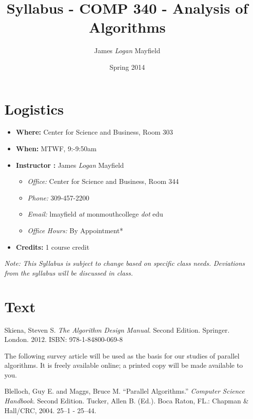 \documentclass[10pt]{article}
\title{Syllabus - COMP 340 - Analysis of Algorithms}
\author{ James \textit{Logan} Mayfield }
\date{ Spring 2014}
\begin{document}
\maketitle

\section{Logistics}
\begin{itemize}
\item \textbf{Where: } Center for Science and Business, Room 303
\item \textbf{When: } MTWF, 9:-9:50am
\item \textbf{Instructor :} James \textit{Logan} Mayfield
\begin{itemize}
\item \textit{Office: } Center for Science and Business, Room 344
\item \textit{Phone: } 309-457-2200
\item \textit{Email: } lmayfield \textit{at} monmouthcollege \textit{dot} edu
\item \textit{Office Hours: } By Appointment*
\end{itemize}
\item \textbf{Credits: } 1 course credit
\end{itemize}
\emph{Note: This Syllabus is subject to change based on specific class needs. Deviations from the syllabus will be discussed in class.}


\section{Text}


Skiena, Steven S. \textit{The Algorithm Design Manual}. Second Edition. Springer. London. 2012. 
\newline ISBN: 978-1-84800-069-8
\vspace{.15in} \newline

The following survey article will be used as the basis for our studies of parallel algorithms.  It is freely available online; a printed copy will be made available to you.
\vspace{.25in}
\newline 


Blelloch, Guy E. and Maggs, Bruce M. ``Parallel Algorithms.'' \textit{Computer Science Handbook.} Second Edition. Tucker, Allen B. (Ed.). Boca Raton, FL.: Chapman \& Hall/CRC, 2004. 25--1 - 25--44.
\end{document}

